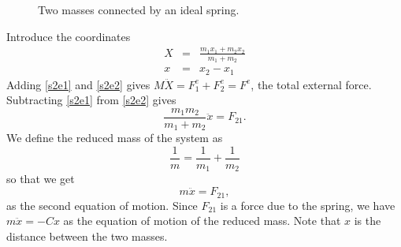 \documentclass{article}
\begin{document}
\begin{figure}[htbp]
  \centering
  \caption{Two masses connected by an ideal spring.}
  \label{f2}
\end{figure}

Introduce the coordinates
\begin{eqnarray}
X &=& \frac{m_1x_1 + m_2x_2}{m_1 + m_2} \label{s2e3} \\
x &=& x_2 - x_1 \label{s2e4}
\end{eqnarray}
Adding \eqref{s2e1} and \eqref{s2e2} gives $M\ddot{X} = F_1^e + F_2^e = F^e$,
the total external force. Subtracting \eqref{s2e1} from \eqref{s2e2} gives
\[
\frac{m_1m_2}{m_1 + m_2}\ddot{x} = F_{21}.
\]
We define the reduced mass of the system as
\begin{equation}\label{s2e5}
\frac{1}{m} = \frac{1}{m_1} + \frac{1}{m_2}
\end{equation}
so that we get 
\begin{equation}\label{s2e6}
m\ddot{x} = F_{21},
\end{equation}
as the second equation of motion. Since $F_{21}$ is a force due to the spring,
we have $m\ddot{x} = -Cx$ as the equation of motion of the reduced mass. Note
that $x$ is the distance between the two masses.
\end{document}
